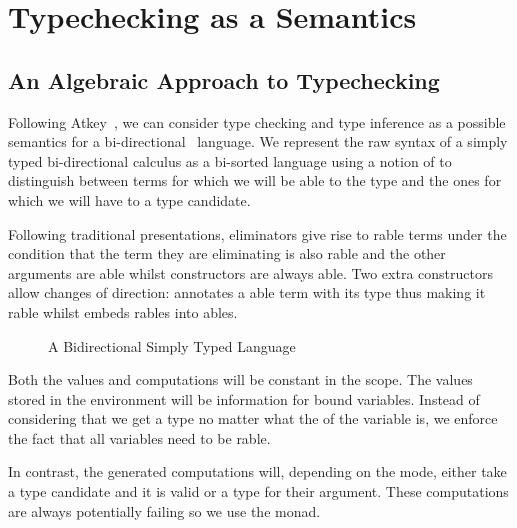 \chapter{Typechecking as a Semantics}


\section{An Algebraic Approach to Typechecking}\label{section:typechecking}

Following Atkey~\citeyear{atkey2015algebraic}, we can consider type checking
and type inference as a possible semantics for a bi-directional~\cite{pierce2000local}
language. We represent the raw syntax of a simply typed bi-directional calculus
as a bi-sorted language using a notion of  to distinguish between terms
for which we will be able to  the type and the ones for which we will
have to  a type candidate.

Following traditional presentations, eliminators give rise to rable
terms under the condition that the term they are eliminating is also rable
and the other arguments are able whilst constructors are always able.
Two extra constructors allow changes of direction:  annotates a able
term with its type thus making it rable whilst  embeds
rables into ables.

\begin{figure}[h]
\caption{A Bidirectional Simply Typed Language}
\end{figure}

Both the values and computations will be constant in the scope. The values stored
in the environment will be  information for bound variables. Instead of
considering that we get a type no matter what the  of the variable is,
we enforce the fact that all variables need to be rable.


In contrast, the generated computations will, depending on the mode, either take a
type candidate and  it is valid or  a type for their argument.
These computations are always potentially failing so we use the  monad.


